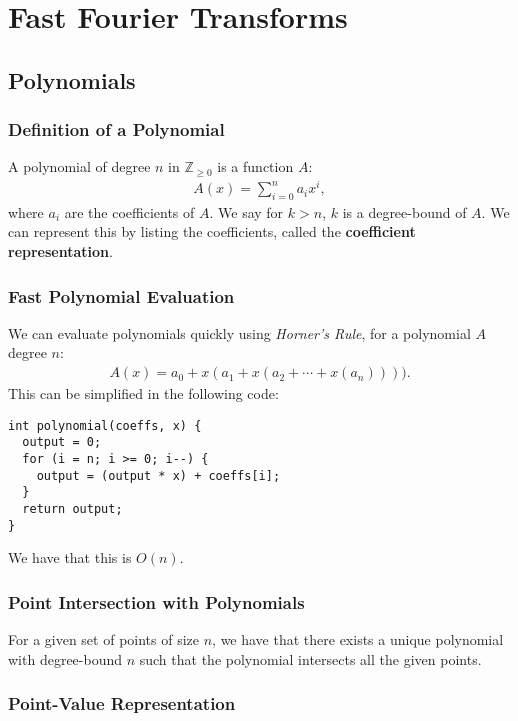 \documentclass[a4paper, 12pt, twoside]{article}
\begin{document}
\vfill

\section{Fast Fourier Transforms}

\subsection{Polynomials}

\subsubsection{Definition of a Polynomial}

A polynomial of degree $n$ in $\mathbb{Z}_{\geq 0}$ is a function $A$: 
\begin{gather*}
  A(x) = \sum_{i = 0}^n a_ix^i,
\end{gather*} where $a_i$ are the coefficients of $A$. We say for 
$k > n$, $k$ is a degree-bound of $A$. We can represent this by listing
the coefficients, called the \textbf{coefficient representation}.

\subsubsection{Fast Polynomial Evaluation}

We can evaluate polynomials quickly using \textit{Horner's Rule},
for a polynomial $A$ degree $n$: \begin{gather*}
  A(x) = a_0 + x(a_1 + x(a_2 + \cdots + x(a_n)))).
\end{gather*} This can be simplified in the following code:
\begin{lstlisting}
int polynomial(coeffs, x) {
  output = 0;
  for (i = n; i >= 0; i--) {
    output = (output * x) + coeffs[i];
  }
  return output;
}
\end{lstlisting} We have that this is $O(n)$.

\subsubsection{Point Intersection with Polynomials}

For a given set of points of size $n$, we have that there exists a 
unique polynomial with degree-bound $n$ such that the polynomial
intersects all the given points.

\subsubsection{Point-Value Representation}
\end{document}
